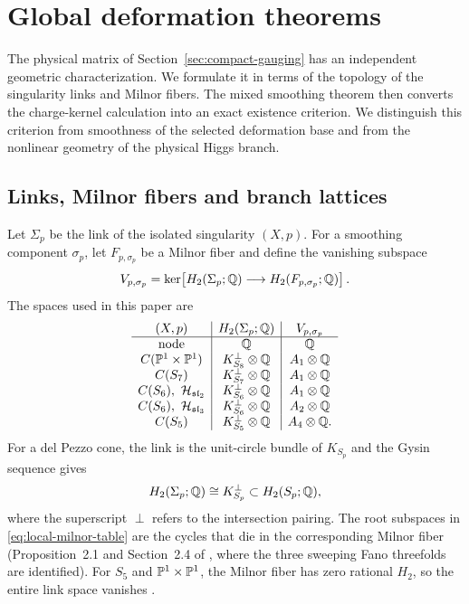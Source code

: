 \section{Global deformation theorems}
\label{sec:global-theorems}

The physical matrix of Section~\ref{sec:compact-gauging} has an independent
geometric characterization. We formulate it in terms of the topology of the
singularity links and Milnor fibers. The mixed smoothing theorem then
converts the charge-kernel calculation into an exact existence criterion.
We distinguish this criterion from smoothness of the selected deformation
base and from the nonlinear geometry of the physical Higgs branch.

\subsection{Links, Milnor fibers and branch lattices}
\label{subsec:link-lattices}

Let $\Sigma_p$ be the link of the isolated singularity $(X,p)$. For a
smoothing component $\sigma_p$, let $F_{p,\sigma_p}$ be a Milnor fiber and
define the vanishing subspace
\begin{equation}
 V_{p,\sigma_p}
 =\ker\!\left[
 H_2(\Sigma_p;\mathbb Q)\longrightarrow H_2(F_{p,\sigma_p};\mathbb Q)
 \right].
 \label{eq:milnor-kernel}
\end{equation}
The spaces used in this paper are
\begin{equation}
 \begin{array}{c|c|c}
 (X,p)&H_2(\Sigma_p;\QQ)&V_{p,\sigma_p}\\
 \hline
 \text{node}&\QQ&\QQ\\
 C(\PP^1\times\PP^1)&K_{S_8}^{\perp}\otimes\QQ&A_1\otimes\QQ\\
 C(S_7)&K_{S_7}^{\perp}\otimes\QQ&A_1\otimes\QQ\\
 C(S_6),\ \cH_{\mathfrak{sl}_2}&K_{S_6}^{\perp}\otimes\QQ&A_1\otimes\QQ\\
 C(S_6),\ \cH_{\mathfrak{sl}_3}&K_{S_6}^{\perp}\otimes\QQ&A_2\otimes\QQ\\
 C(S_5)&K_{S_5}^{\perp}\otimes\QQ&A_4\otimes\QQ.
 \end{array}
 \label{eq:local-milnor-table}
\end{equation}
For a del Pezzo cone, the link is the unit-circle bundle of $K_{S_p}$ and
the Gysin sequence gives
\begin{equation}
 H_2(\Sigma_p;\mathbb Q)\cong K_{S_p}^{\perp}\subset H_2(S_p;\mathbb Q),
 \label{eq:link-gysin}
\end{equation}
where the superscript $\perp$ refers to the intersection pairing. The root
subspaces in \eqref{eq:local-milnor-table} are the cycles that die
in the corresponding Milnor fiber (Proposition~2.1 and Section~2.4 of
\cite{Wuebben:2026obstruction}, where the three sweeping Fano threefolds
are identified). For $S_5$ and $\mathbb P^1\times\mathbb P^1$, the Milnor fiber
has zero rational $H_2$, so the entire link space vanishes
\cite[Lemmas~3.3 and~3.6]{Wuebben:2026smoothing}.

